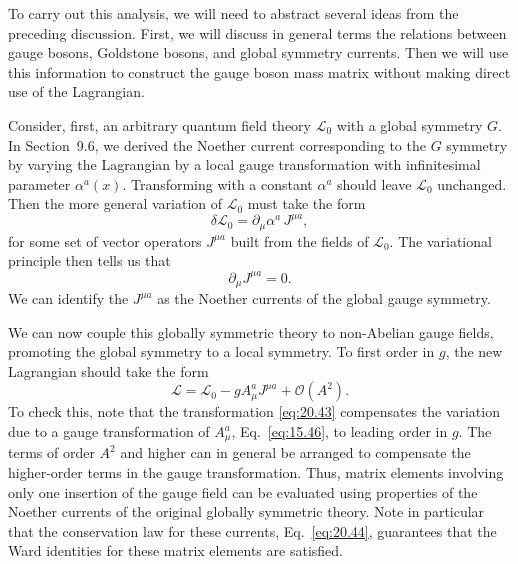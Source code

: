 To carry out this analysis, we will need to abstract several ideas from the
preceding discussion.  First, we will discuss in general terms the relations
between gauge bosons, Goldstone bosons, and global symmetry currents.  Then
we will use this information to construct the gauge boson mass matrix without
making direct use of the Lagrangian.

Consider, first, an arbitrary quantum field theory $\mathcal{L}_0$ with a
global symmetry $G$.  In Section~9.6, we derived the Noether current
corresponding to the $G$ symmetry by varying the Lagrangian by a local gauge
transformation with infinitesimal parameter $\alpha^a(x)$.  Transforming with
a constant $\alpha^a$ should leave $\mathcal{L}_0$ unchanged.  Then the more
general variation of $\mathcal{L}_0$ must take the form
\begin{equation}
  \delta\mathcal{L}_0 = \partial_\mu\alpha^a\,J^{\mu a} ,
  \label{eq:20.43}
\end{equation}
for some set of vector operators $J^{\mu a}$ built from the fields of
$\mathcal{L}_0$.  The variational principle then tells us that
\begin{equation}
  \partial_\mu J^{\mu a} = 0 .
  \label{eq:20.44}
\end{equation}
We can identify the $J^{\mu a}$ as the Noether currents of the global gauge
symmetry.

We can now couple this globally symmetric theory to non-Abelian gauge
fields, promoting the global symmetry to a local symmetry.  To first order in
$g$, the new Lagrangian should take the form
\begin{equation}
  \mathcal{L} = \mathcal{L}_0 - gA^a_\mu J^{\mu a} + \mathcal{O}(A^2) .
  \label{eq:20.45}
\end{equation}
To check this, note that the transformation \eqref{eq:20.43} compensates the
variation due to a gauge transformation of $A^a_\mu$, Eq.~\eqref{eq:15.46}, to
leading order in $g$.  The terms of order $A^2$ and higher can in general be
arranged to compensate the higher-order terms in the gauge transformation.
Thus, matrix elements involving only one insertion of the gauge field can be
evaluated using properties of the Noether currents of the original globally
symmetric theory.  Note in particular that the conservation law for these
currents, Eq.~\eqref{eq:20.44}, guarantees that the Ward identities for these
matrix elements are satisfied.

